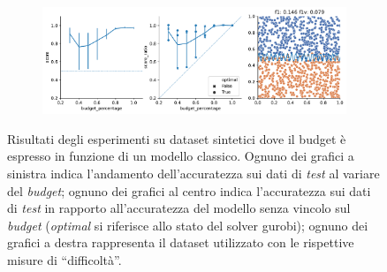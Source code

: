 \begin{figure}
\begin{subfigure}{.5\textwidth}
    \end{subfigure}%
    \begin{subfigure}{.5\textwidth}
        \centering
        \includegraphics[width=\textwidth]{img/2d/8.pdf}
    \end{subfigure}%

\caption{Risultati degli esperimenti su dataset sintetici dove il budget è espresso in funzione di un modello classico. Ognuno dei grafici a sinistra indica l'andamento dell'accuratezza sui dati di \emph{test} al variare del \emph{budget}; ognuno dei grafici al centro indica l'accuratezza sui dati di \emph{test} in rapporto all'accuratezza del modello senza vincolo sul \emph{budget} (\emph{optimal} si riferisce allo stato del solver gurobi); ognuno dei grafici a destra rappresenta il dataset utilizzato con le rispettive misure di ``difficoltà''.}
\label{fig:risultati_2d_1}
\end{figure}
